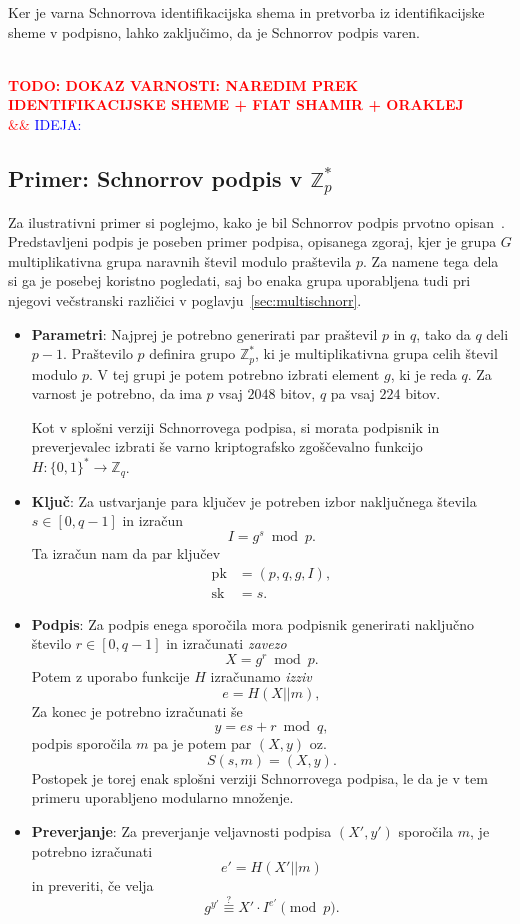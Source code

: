 \documentclass[isrm2, tisk]{fmfdelo}
\newcommand{\Z}{\mathbb Z}
\newcommand{\todo}[2][]{%
    \textcolor{red}{%
        \\ \textbf{\uppercase{todo: #2}}%
        \\%
        \ifx&#1&%
        \else%
            \textcolor{blue}{\uppercase{ideja:} #1}%
            \\%
        \fi%
    }%
}
\begin{document}
Ker je varna Schnorrova identifikacijska shema in pretvorba iz identifikacijske sheme v podpisno,
lahko zaključimo, da je Schnorrov podpis varen.

\todo{dokaz varnosti: naredim prek identifikacijske sheme + fiat shamir + oraklej}

\subsection{Primer: Schnorrov podpis v \texorpdfstring{$\Z_p^*$}{Zp∗}}
Za ilustrativni primer si poglejmo, kako je bil Schnorrov podpis prvotno opisan~\cite{schnorr1989sig}.
Predstavljeni podpis je poseben primer podpisa, opisanega zgoraj, kjer je grupa $G$ multiplikativna
grupa naravnih števil modulo praštevila $p$. Za namene tega dela si ga je posebej koristno pogledati,
saj bo enaka grupa uporabljena tudi pri njegovi večstranski različici v poglavju~\ref{sec:multischnorr}.
\begin{itemize}
    \item \textbf{Parametri}:
    Najprej je potrebno generirati par praštevil $p$ in $q$, tako da $q$ deli $p - 1$. Praštevilo $p$
    definira grupo $\Z_p^*$, ki je multiplikativna grupa celih števil modulo $p$. V tej grupi je potem
    potrebno izbrati element $g$, ki je reda $q$. Za varnost je potrebno, da ima $p$ vsaj $2048$ bitov,
    $q$ pa vsaj $224$ bitov.

    Kot v splošni verziji Schnorrovega podpisa, si morata podpisnik in preverjevalec izbrati še varno
    kriptografsko zgoščevalno funkcijo $H : \{0, 1\}^* \rightarrow \Z_q$.

    \item \textbf{Ključ}:
    Za ustvarjanje para ključev je potreben izbor naključnega števila $s \in [0, q - 1]$
    in izračun 
    $$ 
    I = g^s \bmod p.
    $$
    Ta izračun nam da par ključev
    \begin{align*}
    \text{pk} &= (p, q, g, I), \\
    \text{sk} &= s.
    \end{align*}

    \item \textbf{Podpis}:
    Za podpis enega sporočila mora podpisnik generirati naključno število $r \in [0, q-1]$ in izračunati 
    \textit{zavezo} 
    $$ 
    X = g^r \bmod p.
    $$ 
    Potem z uporabo funkcije $H$ izračunamo \textit{izziv} 
    $$
    e = H(X || m),
    $$
    Za konec je potrebno izračunati še 
    $$ 
    y = es + r \bmod q, 
    $$
    podpis sporočila $m$ pa je potem par $(X, y)$ oz.\ 
    $$ 
    S(s, m) = (X, y).
    $$
    Postopek je torej enak splošni verziji Schnorrovega podpisa, le da je v tem primeru uporabljeno
    modularno množenje.

    \item \textbf{Preverjanje}:
    Za preverjanje veljavnosti podpisa $(X', y')$ sporočila $m$, je potrebno izračunati 
    $$ 
    e' = H(X' || m)
    $$
    in preveriti, če velja 
    \begin{equation}
        g^{y'} \stackrel{?}{\equiv} X' \cdot I^{e'} \pmod p. \label{eq:schnorr-ver}
    \end{equation}
\end{itemize}
\end{document}
